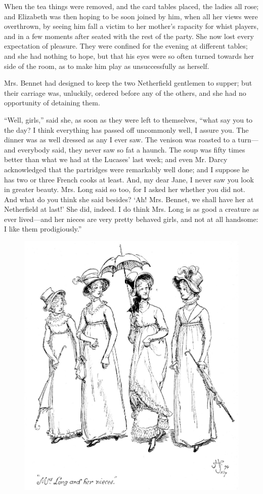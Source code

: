 \documentclass[10pt]{book}
\begin{document}
   When the tea things were removed, and the card tables placed, the ladies
all rose; and Elizabeth was then hoping to be soon joined by him, when
all her views were overthrown, by seeing him fall a victim to her
mother’s rapacity for whist players, and in a few moments after seated
with the rest of the party. She now lost every expectation of pleasure.
They were confined for the evening at different tables; and she had
nothing to hope, but that his eyes were so often turned towards her side
of the room, as to make him play as unsuccessfully as herself.
  

   Mrs. Bennet had designed to keep the two Netherfield gentlemen to
supper; but their carriage was, unluckily, ordered before any of the
others, and she had no opportunity of detaining them.
  

   “Well, girls,” said she, as soon as they were left to themselves, “what
say you to the day? I think everything has passed off uncommonly well, I
assure you. The dinner was as well dressed as any I ever saw. The
venison was roasted to a turn—and everybody said, they never saw so fat
a haunch. The soup was fifty times better than what we had at the
Lucases’ last week; and even Mr. Darcy acknowledged that the partridges
were
   remarkably well done; and I suppose he has two or three French
cooks at least. And, my dear Jane, I never saw you look in greater
beauty. Mrs. Long said so too, for I asked her whether you did not. And
what do you think she said besides? ‘Ah! Mrs. Bennet, we shall have her
at Netherfield at last!’ She did, indeed. I do think Mrs. Long is as
good a creature as ever lived—and her nieces are very pretty behaved
girls, and not at all handsome: I like them prodigiously.”
  

\begin{figure}[h]
\centering
\includegraphics[width=\linewidth]{images/i_449.jpg}
\end{figure}
\end{document}
